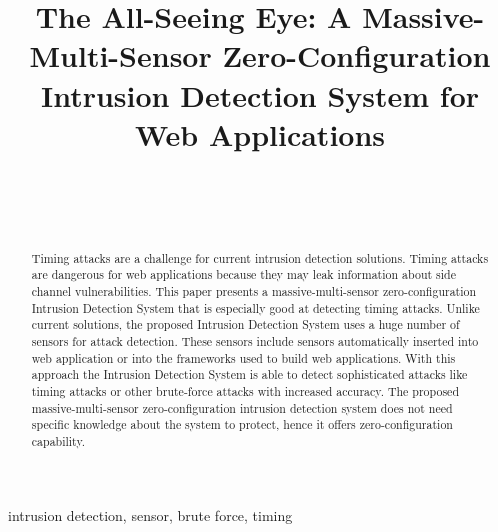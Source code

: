 \documentclass[conference]{IEEEtran}
\begin{document}
\pagestyle{fancy}
\title{The All-Seeing Eye: A Massive-Multi-Sensor Zero-Configuration Intrusion Detection System for Web Applications}


\author{\\
\and
{}\\

}


\maketitle
\thispagestyle{firstpage}

\begin{abstract}
\boldmath
Timing attacks are a challenge for current intrusion detection solutions. 
Timing attacks are dangerous for web applications because they may leak information about side channel vulnerabilities. 
This paper presents a massive-multi-sensor zero-configuration Intrusion Detection System that is especially good at detecting timing attacks. 
Unlike current solutions, the proposed Intrusion Detection System uses a huge number of sensors for attack detection. 
These sensors include sensors automatically inserted into web application or into the frameworks used to build web applications. 
With this approach the Intrusion Detection System is able to detect sophisticated attacks like timing attacks or other brute-force attacks with increased accuracy.
The proposed massive-multi-sensor zero-configuration intrusion detection system does not need specific knowledge about the system to protect, hence it offers zero-configuration capability.
\end{abstract}

\begin{IEEEkeywords}
intrusion detection, sensor, brute force, timing
\end{IEEEkeywords}
\end{document}
